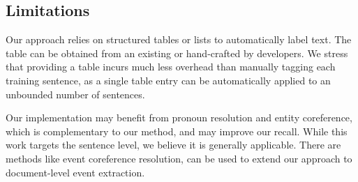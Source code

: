 %

\subsection{Limitations}
Our approach relies on structured tables or lists to automatically label text. The table can be obtained from an existing \KB or
hand-crafted by developers. We stress that providing a table incurs much less overhead than manually tagging each training sentence, as a
single table entry can be automatically applied to an unbounded number of sentences.



Our implementation may benefit from pronoun resolution and entity coreference, %
which is complementary to our method, and may improve our recall.
While this work targets the sentence level, we believe it is generally applicable. There are methods like event coreference resolution\cite{liao2010using,berant2014modeling}, can be used to extend our approach to document-level event extraction.
